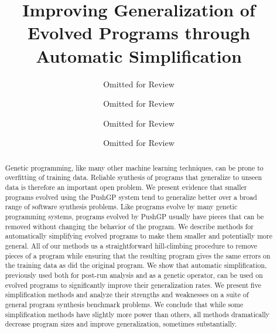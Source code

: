 \documentclass[sigconf]{acmart}
\begin{document}
\title{Improving Generalization of Evolved Programs through Automatic Simplification}

\author{Omitted for Review}

\author{Omitted for Review}

\author{Omitted for Review}

\author{Omitted for Review}

%
%
%



\begin{abstract}
Genetic programming, like many other machine learning techniques, can be prone to overfitting of training data. Reliable synthesis of programs that generalize to unseen data is therefore an important open problem. We present evidence that smaller programs evolved using the PushGP system tend to generalize better over a broad range of software synthesis problems. 
Like programs evolve by many genetic programming systems, programs evolved by PushGP usually 
have pieces that can be removed without changing the behavior of the program. We describe methods for automatically simplifying evolved programs to make them smaller and potentially more general. All of our methods us a straightforward hill-climbing procedure to remove pieces of a program while ensuring that the resulting program gives the same errors on the training data as did the original program. We show that automatic simplification, previously used both for post-run analysis and as a genetic operator, can be used on evolved programs to significantly improve their generalization rates. We present five simplification methods and analyze their strengths and weaknesses on a suite of general program synthesis benchmark problems. We conclude that while some simplification methods have slightly more power than others, all methods dramatically decrease program sizes and improve generalization,
sometimes substantially.
\end{abstract}
\end{document}
